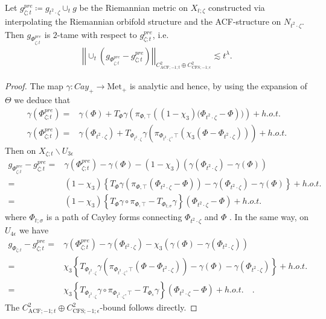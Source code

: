 \documentclass[psamsfonts]{amsart}
\theoremstyle{plain}
\theoremstyle{definition}{
\newtheorem{defi}{Definition}[section]
\newtheorem{ass}{Assumption}
\newtheorem*{nota}{Notation}}
\theoremstyle{remark}{
\newtheorem{rem}{Remark}
\newtheorem{ex}{Example}}
\theoremstyle{plain}{
\newtheorem{thm}{Theorem}[section]
\newtheorem{lem}{Lemma}[section]
\newtheorem{cor}{Corollary}[section]
\newtheorem{prop}{Proposition}[section]
\newtheorem{con}{Conjecture}[section]}
\newcommand{\m}[1]{{\mathrm{#1}}}
\begin{document}
\begin{lem}
\label{pregluedmetricclosetoDiracmetric}
Let $g^{pre}_{\zeta;t}\coloneqq g_{t^2\cdot\zeta}\cup_t g$ be the Riemannian metric on $X_{t;\zeta}$ constructed via interpolating the Riemannian orbifold structure and the ACF-structure on $N_{t^2\cdot\zeta}$. Then $g_{\Phi^{pre}_{\zeta;t}}$ is $2$-tame with respect to $g^{pre}_{\zeta;t}$, i.e. 
\begin{align*}
    \left|\left|\cup_t(g_{\Phi^{pre}_{\zeta;t}}-g^{pre}_{\zeta;t})\right|\right|_{C^{2}_{\m{ACF};-1;t}\oplus C^2_{\m{CFS};-1;\epsilon}}\lesssim t^\lambda.
\end{align*}
\end{lem}

\begin{proof}
The map $\gamma\colon Cay_+\rightarrow \m{Met}_+$ is analytic and hence, by using the expansion of $\Theta$ we deduce that  
    \begin{align*}
        \gamma(\Phi^{pre}_{\zeta;t})=&\gamma(\Phi)+T_\Phi\gamma\left(\pi_{\Phi,\top}\left((1-\chi_3)(\Phi_{t^2\cdot\zeta}-\Phi\right))\right)+h.o.t.\\
        \gamma(\Phi^{pre}_{\zeta;t})=&\gamma(\Phi_{t^2\cdot\zeta})+T_{\Phi_{t^2\cdot\zeta}}\gamma\left(\pi_{\Phi_{t^2\cdot\zeta},\top}\left(\chi_3(\Phi-\Phi_{t^2\cdot\zeta})\right)\right)+h.o.t.
    \end{align*}
Then on $X_{\zeta;t}\backslash U_{3\epsilon}$
    \begin{align*}
        g_{\Phi^{pre}_{\zeta;t}}-g^{pre}_{\zeta;t}=&\gamma(\Phi^{pre}_{\zeta;t})-\gamma(\Phi)-(1-\chi_3)(\gamma(\Phi_{t^2\cdot\zeta})-\gamma(\Phi))\\
        =&(1-\chi_3)\left\{T_{\Phi}\gamma\left(\pi_{\Phi,\top}\left(\Phi_{t^2\cdot\zeta}-\Phi\right)\right)-\gamma(\Phi_{t^2\cdot\zeta})-\gamma(\Phi)\right\}+h.o.t.\\
        =&(1-\chi_3)\left\{T_{\Phi}\gamma\circ\pi_{\Phi,\top}-T_{\Phi_{t;\sigma}}\gamma\right\}(\Phi_{t^2\cdot\zeta}-\Phi)+h.o.t.
    \end{align*}
where $\Phi_{t;\sigma}$ is a path of Cayley forms connecting $\Phi_{t^2\cdot\zeta}$ and $\Phi$ . In the same way, on $U_{4\epsilon}$ we have 
\begin{align*}
        g_{\Phi_{\zeta;t}}-g^{pre}_{\zeta;t}=&\gamma(\Phi^{pre}_{\zeta;t})-\gamma(\Phi_{t^2\cdot\zeta})-\chi_3(\gamma(\Phi)-\gamma(\Phi_{t^2\cdot\zeta}))\\
        =&\chi_3\left\{T_{\Phi_{t^2\cdot\zeta}}\gamma\left(\pi_{\Phi_{t^2\cdot\zeta},\top}\left(\Phi-\Phi_{t^2\cdot\zeta}\right)\right)-\gamma(\Phi)-\gamma(\Phi_{t^2\cdot\zeta})\right\}+h.o.t.\\
        =&\chi_3\left\{T_{\Phi_{t^2\cdot\zeta}}\gamma\circ \pi_{\Phi_{t^2\cdot\zeta},\top}-T_{\Phi_{s}}\gamma\right\}(\Phi_{t^2\cdot\zeta}-\Phi)+h.o.t.\quad.
\end{align*} 
The $C^{2}_{\m{ACF};-1;t}\oplus C^2_{\m{CFS};-1;\epsilon}$-bound follows directly.
\end{proof}
\end{document}

